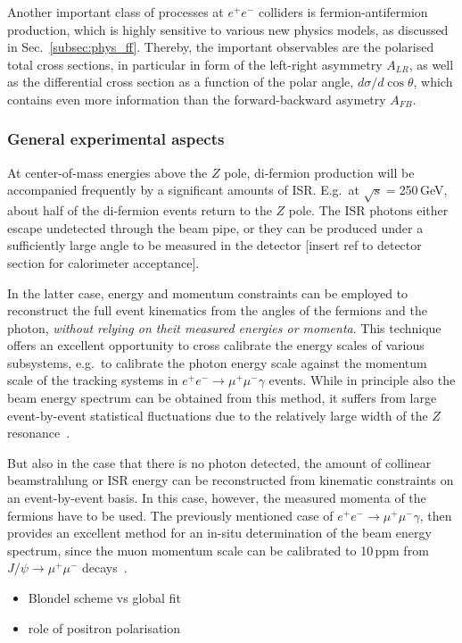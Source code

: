 Another important class of processes at $e^+e^-$ colliders is fermion-antifermion production, which is highly sensitive to various new physics models, as discussed in Sec.~\ref{subsec:phys_ff}. Thereby, the important observables are the polarised total cross sections, in particular in form of the left-right asymmetry $A_{LR}$, as well as the differential cross section as a function of the polar angle, $d\sigma/d \cos{\theta}$, which contains even more information than the forward-backward asymetry $A_{FB}$.

\subsubsection{General experimental aspects}

At center-of-mass energies above the $Z$ pole, di-fermion production will be accompanied frequently by a significant amounts of ISR. E.g.\ at $\sqrt{s}=$250\,GeV, about half of the di-fermion events return to the $Z$ pole. The ISR photons either escape undetected through the beam pipe, or they can be produced under a sufficiently large angle to be measured in the detector {\color{red} [insert ref to detector section for calorimeter acceptance]}.

In the latter case, energy and momentum constraints can be employed to reconstruct the full event kinematics from the angles of the fermions and the photon, {\em without relying on theit measured energies or momenta}. This technique offers an excellent opportunity to cross calibrate the energy scales of various subsystems, e.g.\ to calibrate the photon energy scale against the momentum scale of the tracking systems in $e^+e^- \to \mu^+\mu^-\gamma $ events. While in principle also the beam energy spectrum can be obtained from this method, it suffers from large event-by-event statistical fluctuations due to the relatively large width of the $Z$ resonance~\cite{Wilson:2016hne}.

But also in the case that there is no photon detected, the amount of collinear beamstrahlung or ISR energy can be reconstructed from kinematic constraints on an event-by-event basis. In this case, however, the measured momenta of the fermions have to be used. The previously mentioned case of $e^+e^- \to \mu^+\mu^-\gamma $, then provides an excellent method for an in-situ determination of the beam energy spectrum, since the muon momentum scale can be calibrated to 10\,ppm from $J/\psi \to \mu^+\mu^-$ decays~\cite{Wilson:2016hne}.


\begin{itemize}
\item Blondel scheme vs global fit
\item role of positron polarisation
\end{itemize}

